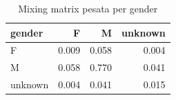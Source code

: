 \begin{table}
\centering
\caption{Mixing matrix pesata per gender}
\label{tab:t3_mixing_gender_pesata}
\begin{tabular}{lrrr}
\toprule
 gender &     F &     M &  unknown \\
\midrule
      F & 0.009 & 0.058 &    0.004 \\
      M & 0.058 & 0.770 &    0.041 \\
unknown & 0.004 & 0.041 &    0.015 \\
\bottomrule
\end{tabular}
\end{table}

